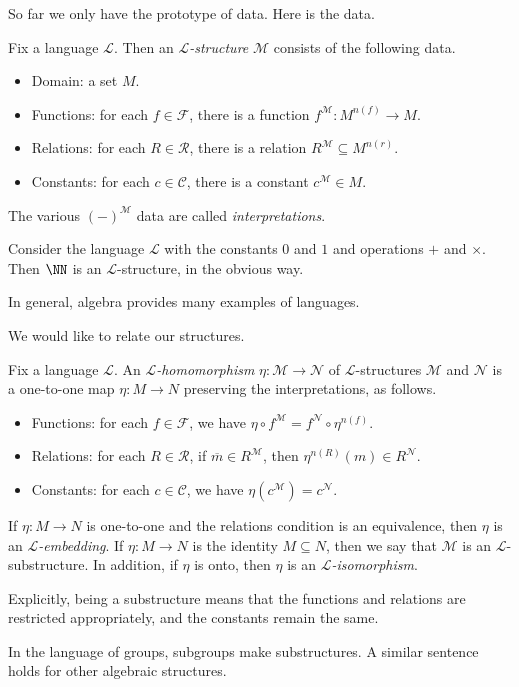\documentclass[../notes.tex]{subfiles}
\begin{document}
So far we only have the prototype of data. Here is the data.
\begin{definition}[structure]
	Fix a language $\mathcal L$. Then an \textit{$\mathcal L$-structure} $\mathcal M$ consists of the following data.
	\begin{itemize}
		\item Domain: a set $M$.
		\item Functions: for each $f\in\mathcal F$, there is a function $f^{\mathcal M}\colon M^{n(f)}\to M$.
		\item Relations: for each $R\in\mathcal R$, there is a relation $R^\mathcal M\subseteq M^{n(r)}$.
		\item Constants: for each $c\in\mathcal C$, there is a constant $c^\mathcal M\in M$.
	\end{itemize}
	The various $(-)^\mathcal M$ data are called \textit{interpretations}.
\end{definition}
\begin{example}
	Consider the language $\mathcal L$ with the constants $0$ and $1$ and operations $+$ and $\times$. Then $\NN$ is an $\mathcal L$-structure, in the obvious way.
\end{example}
In general, algebra provides many examples of languages.

We would like to relate our structures.
\begin{defihelper}   
	Fix a language $\mathcal L$. An \textit{$\mathcal L$-homomorphism} $\eta\colon\mathcal M\to\mathcal N$ of $\mathcal L$-structures $\mathcal M$ and $\mathcal N$ is a one-to-one map $\eta\colon M\to N$ preserving the interpretations, as follows.
	\begin{itemize}
		\item Functions: for each $f\in\mathcal F$, we have $\eta\circ f^\mathcal M=f^\mathcal N\circ\eta^{n(f)}$.
		\item Relations: for each $R\in\mathcal R$, if $\overline m\in R^\mathcal M$, then $\eta^{n(R)}(m)\in R^\mathcal N$.
		\item Constants: for each $c\in\mathcal C$, we have $\eta\left(c^\mathcal M\right)=c^\mathcal N$.
	\end{itemize}
	If $\eta\colon M\to N$ is one-to-one and the relations condition is an equivalence, then $\eta$ is an \textit{$\mathcal L$-embedding}. If $\eta\colon M\to N$ is the identity $M\subseteq N$, then we say that $\mathcal M$ is an $\mathcal L$-substructure. In addition, if $\eta$ is onto, then $\eta$ is an \textit{$\mathcal L$-isomorphism}.
\end{defihelper}
Explicitly, being a substructure means that the functions and relations are restricted appropriately, and the constants remain the same.
\begin{example}
	In the language of groups, subgroups make substructures. A similar sentence holds for other algebraic structures.
\end{example}
\end{document}
